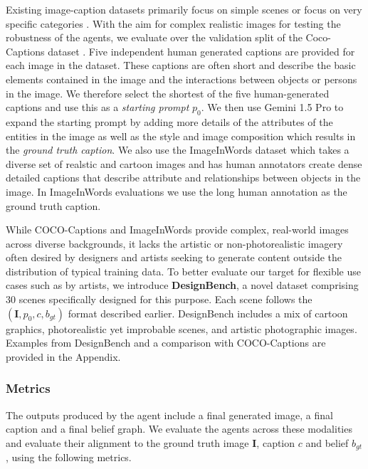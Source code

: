 Existing image-caption datasets primarily focus on simple scenes \citep{deng2009imagenet, krizhevsky2009learning, deng2012mnist} or focus on very specific categories \citep{liu2016deepfashion, liao2022artbench}. With the aim for complex realistic images for testing the robustness of the agents, we evaluate over the validation split of the Coco-Captions dataset \citep{chen2015microsoft}. Five independent human generated captions are provided for each image in the dataset. These captions are often short and describe the basic elements contained in the image and the interactions between objects or persons in the image. We therefore select the shortest of the five human-generated captions and use this as a \textit{starting prompt} $p_0$. We then use Gemini 1.5 Pro to expand the starting prompt by adding more details of the attributes of the entities in the image as well as the style and image composition which results in the \textit{ground truth caption}. We also use the ImageInWords \citep{garg2024imageinwordsunlockinghyperdetailedimage} dataset which takes a diverse set of realstic and cartoon images and has human annotators create dense detailed captions that describe attribute and relationships between objects in the image. In ImageInWords evaluations we use the long human annotation as the ground truth caption.
 

While COCO-Captions and ImageInWords provide complex, real-world images across diverse backgrounds, it lacks the artistic or non-photorealistic imagery often desired by designers and artists seeking to generate content outside the distribution of typical training data.  To better evaluate our target for flexible use cases such as by  artists, we introduce \textbf{DesignBench}, a novel dataset comprising 30 scenes specifically designed for this purpose. Each scene follows the $(\mathbf{I}, p_0, c, b_{gt})$ format described earlier. DesignBench includes a mix of cartoon graphics, photorealistic yet improbable scenes, and artistic photographic images. Examples from DesignBench and a comparison with COCO-Captions are provided in the Appendix.


\subsubsection{Metrics}
The outputs produced by the agent include a final generated image, a final caption and a final belief graph. We evaluate the agents across these modalities and evaluate their alignment to the ground truth image $\mathbf{I}$, caption $c$ and belief $b_{gt}$, using the following metrics. 

